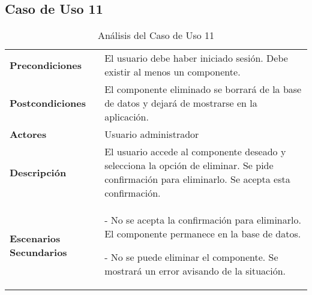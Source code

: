 \subsection{Caso de Uso 11}
\begin{table}[H]
  \centering
  \vspace{-5mm}
  \caption{Análisis del Caso de Uso 11}
    \begin{tabular}{p{7.5em}p{24.145em}}
    \toprule
    \rowcolor[rgb]{ .871,  .918,  .965} \multicolumn{2}{p{31.645em}}{\textbf{Eliminar componente}} \\
    \midrule
    \rowcolor[rgb]{ .906,  .902,  .902} \textbf{Precondiciones} & \cellcolor[rgb]{ 1,  1,  1}El usuario debe haber iniciado sesión. Debe existir al menos un componente. \\
    \midrule
    \rowcolor[rgb]{ .906,  .902,  .902} \textbf{Postcondiciones} & \cellcolor[rgb]{ 1,  1,  1}El componente eliminado  se borrará de la base de datos y dejará de mostrarse en la aplicación. \\
    \midrule
    \rowcolor[rgb]{ .906,  .902,  .902} \textbf{Actores} & \cellcolor[rgb]{ 1,  1,  1}Usuario administrador \\
    \midrule
    \rowcolor[rgb]{ .906,  .902,  .902} \textbf{Descripción} & \cellcolor[rgb]{ 1,  1,  1}El usuario accede al componente deseado y selecciona la opción de eliminar. Se pide confirmación para eliminarlo. Se acepta esta confirmación.  \\
    \midrule
    \rowcolor[rgb]{ .906,  .902,  .902} \textbf{Escenarios          Secundarios} & \cellcolor[rgb]{ 1,  1,  1}- No se acepta la confirmación para eliminarlo. El componente permanece en la base de datos.\par - No se puede eliminar el componente. Se mostrará un error avisando de la situación.  \\
    \bottomrule
    \end{tabular}%
\end{table}%